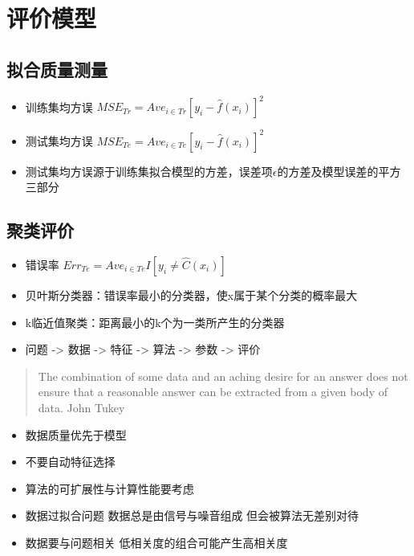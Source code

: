 \documentclass[]{book}
\providecommand{\tightlist}{%
  \setlength{\itemsep}{0pt}\setlength{\parskip}{0pt}}
\begin{document}
\hypertarget{ux8bc4ux4ef7ux6a21ux578b}{%
\section{评价模型}\label{ux8bc4ux4ef7ux6a21ux578b}}

\hypertarget{ux62dfux5408ux8d28ux91cfux6d4bux91cf}{%
\subsection{拟合质量测量}\label{ux62dfux5408ux8d28ux91cfux6d4bux91cf}}

\begin{itemize}
\tightlist
\item
  训练集均方误 \(MSE_{Tr} = Ave_{i \in Tr}[y_{i} − \hat f(x_i)]^2\)
\item
  测试集均方误 \(MSE_{Te} = Ave_{i \in Te}[y_{i} − \hat f(x_i)]^2\)
\item
  测试集均方误源于训练集拟合模型的方差，误差项\(\epsilon\)的方差及模型误差的平方三部分
\end{itemize}

\hypertarget{ux805aux7c7bux8bc4ux4ef7}{%
\subsection{聚类评价}\label{ux805aux7c7bux8bc4ux4ef7}}

\begin{itemize}
\item
  错误率 \(Err_{Te} = Ave_{i \in Te}I[y_i \neq \hat C(x_i)]\)
\item
  贝叶斯分类器：错误率最小的分类器，使x属于某个分类的概率最大
\item
  k临近值聚类：距离最小的k个为一类所产生的分类器
\item
  问题 -\textgreater{} 数据 -\textgreater{} 特征 -\textgreater{} 算法 -\textgreater{} 参数 -\textgreater{} 评价
\end{itemize}

\begin{quote}
The combination of some data and an aching desire for an answer does not ensure that a reasonable answer can be extracted from a given body of data. John Tukey
\end{quote}

\begin{itemize}
\tightlist
\item
  数据质量优先于模型
\item
  不要自动特征选择
\item
  算法的可扩展性与计算性能要考虑
\item
  数据过拟合问题 数据总是由信号与噪音组成 但会被算法无差别对待
\item
  数据要与问题相关 低相关度的组合可能产生高相关度
\end{itemize}
\end{document}
